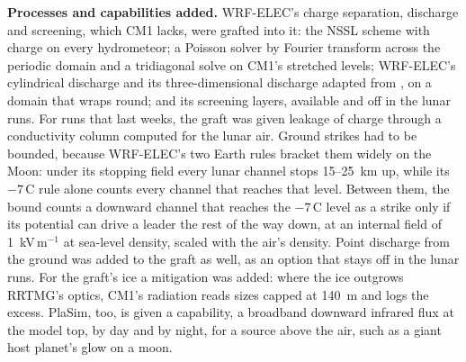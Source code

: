 \textbf{Processes and capabilities added.} WRF-ELEC's charge separation, discharge and screening, which CM1
lacks, were grafted into it: the NSSL scheme with charge on every hydrometeor; a Poisson solver by Fourier
transform across the periodic domain and a tridiagonal solve on CM1's stretched levels; WRF-ELEC's cylindrical
discharge \autocite{ziegler1994observed} and its three-dimensional discharge adapted from
\textcite{macgorman2001lightning}, on a domain that wraps round; and its screening layers, available and off in
the lunar runs. For runs that last weeks, the graft was given leakage of charge through a
conductivity column computed for the lunar air. Ground strikes had to be bounded, because WRF-ELEC's two Earth
rules bracket them widely on the Moon: under its stopping field every lunar channel stops 15--25~km up, while
its $-7$\,\textdegree C rule alone counts every channel that reaches that level. Between them, the bound counts a
downward channel that reaches the $-7$\,\textdegree C level as a strike only if its potential can drive a leader the rest of the way down, at an internal field of 1~kV\,m$^{-1}$ at sea-level density, scaled with the
air's density. Point discharge from the ground was added to the graft as well, as an option that stays off in the lunar runs. For the graft's ice a mitigation was added: where the ice outgrows RRTMG's optics, CM1's radiation reads sizes capped at 140~\textmu m and logs the excess. PlaSim, too, is given a
capability, a broadband downward infrared flux at the model top, by day and by night, for a source above the
air, such as a giant host planet's glow on a moon.

